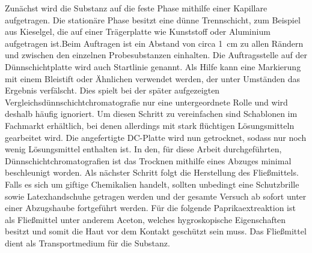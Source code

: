 \documentclass[11pt]{scrreprt}
\begin{document}
 Zunächst wird die Substanz auf die feste Phase mithilfe einer Kapillare aufgetragen. Die stationäre Phase  besitzt eine dünne Trennschicht, zum Beispiel aus Kieselgel,  die auf einer Trägerplatte wie Kunststoff oder Aluminium aufgetragen ist.Beim Auftragen ist ein Abstand von circa \SI{1}{\centi\meter} zu allen Rändern und zwischen den einzelnen Probesubstanzen einhalten. Die Auftragsstelle auf der Dünnschichtplatte wird auch Startlinie genannt. Als Hilfe kann eine Markierung mit einem Bleistift oder Ähnlichen verwendet werden, der unter Umständen das Ergebnis verfälscht. Dies spielt bei der später aufgezeigten Vergleichsdünnschichtchromatografie nur eine untergeordnete Rolle und wird deshalb häufig ignoriert. Um diesen Schritt zu vereinfachen sind Schablonen im Fachmarkt erhältlich, bei denen allerdings mit stark flüchtigen Lösungsmitteln gearbeitet wird. Die angefertigte DC-Platte  wird nun getrocknet, sodass nur noch wenig Lösungsmittel enthalten ist. In den, für diese Arbeit durchgeführten, Dünnschichtchromatografien ist das Trocknen mithilfe eines Abzuges minimal beschleunigt worden. Als nächster Schritt folgt die Herstellung des Fließmittels. Falls es sich um giftige Chemikalien handelt, sollten unbedingt eine Schutzbrille sowie Latexhandschuhe getragen werden und der gesamte Versuch ab sofort unter einer Abzugshaube fortgeführt werden. Für die folgende Paprikaextreaktion ist als Fließmittel unter anderem Aceton, welches hygroskopische Eigenschaften besitzt und somit die Haut vor dem Kontakt geschützt sein muss. Das Fließmittel dient als Transportmedium für die Substanz.
 
\end{document}
